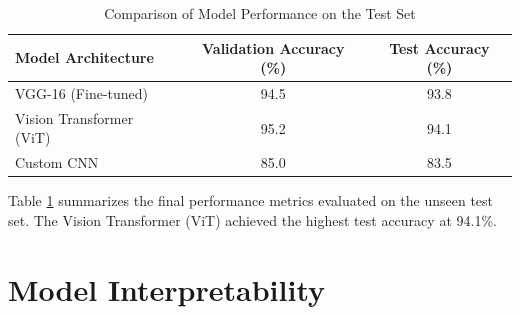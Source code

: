 \documentclass[a4paper,12pt]{report}
\begin{document}
\begin{table}[htbp] %
    \centering %
    \caption{Comparison of Model Performance on the Test Set} %
    \label{tab:model_accuracy} %
    \begin{tabular}{lcc} %
        \toprule %
        Model Architecture & Validation Accuracy (\%) & Test Accuracy (\%) \\ %
        \midrule %
        VGG-16 (Fine-tuned) & 94.5 & 93.8 \\ %
        Vision Transformer (ViT) & 95.2 & 94.1 \\ %
        Custom CNN & 85.0 & 83.5 \\ %
        \bottomrule %
    \end{tabular}
\end{table}

Table \ref{tab:model_accuracy} summarizes the final performance metrics evaluated on the unseen test set. The Vision Transformer (ViT) achieved the highest test accuracy at 94.1\%.






\section*{Model Interpretability} %
\end{document}
